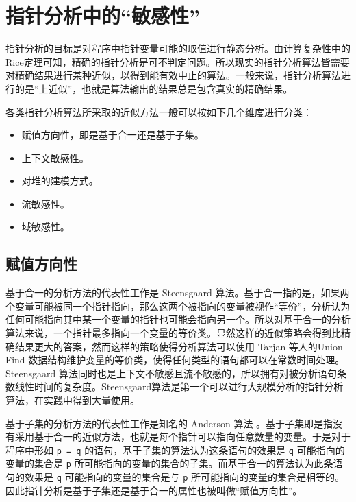 
\chapter{指针分析中的“敏感性”}\label{relatedWork}

指针分析的目标是对程序中指针变量可能的取值进行静态分析。由计算复杂性中的Rice定理\supercite{rice}可知，精确的指针分析是可不判定问题。所以现实的指针分析算法皆需要对精确结果进行某种近似，以得到能有效中止的算法。一般来说，指针分析算法进行的是“上近似”，也就是算法输出的结果总是包含真实的精确结果。

各类指针分析算法所采取的近似方法一般可以按如下几个维度进行分类：

\begin{itemize}
	\item 赋值方向性，即是基于合一还是基于子集。
	\item 上下文敏感性。
	\item 对堆的建模方式。
	\item 流敏感性。
	\item 域敏感性。
\end{itemize}

\section{赋值方向性}
基于合一的分析方法的代表性工作是 Steensgaard 算法\supercite{Steensgaard1996}。基于合一指的是，如果两个变量可能被同一个指针指向，那么这两个被指向的变量被视作“等价”，分析认为任何可能指向其中某一个变量的指针也可能会指向另一个。所以对基于合一的分析算法来说，一个指针最多指向一个变量的等价类。显然这样的近似策略会得到比精确结果更大的答案，然而这样的策略使得分析算法可以使用 Tarjan 等人的Union-Find\supercite{Tarjan} 数据结构维护变量的等价类，使得任何类型的语句都可以在常数时间处理。Steensgaard 算法同时也是上下文不敏感且流不敏感的，所以拥有对被分析语句条数线性时间的复杂度。Steensgaard算法是第一个可以进行大规模分析的指针分析算法，在实践中得到大量使用。

基于子集的分析方法的代表性工作是知名的 Anderson 算法 \supercite{andersen1994program}。基于子集即是指没有采用基于合一的近似方法，也就是每个指针可以指向任意数量的变量。于是对于程序中形如 \verb|p = q| 的语句，基于子集的算法认为这条语句的效果是 \verb|q| 可能指向的变量的集合是 \verb|p| 所可能指向的变量的集合的子集。而基于合一的算法认为此条语句的效果是 \verb|q| 可能指向的变量的集合是与 \verb|p| 所可能指向的变量的集合是相等的。因此指针分析是基于子集还是基于合一的属性也被叫做“赋值方向性”。

